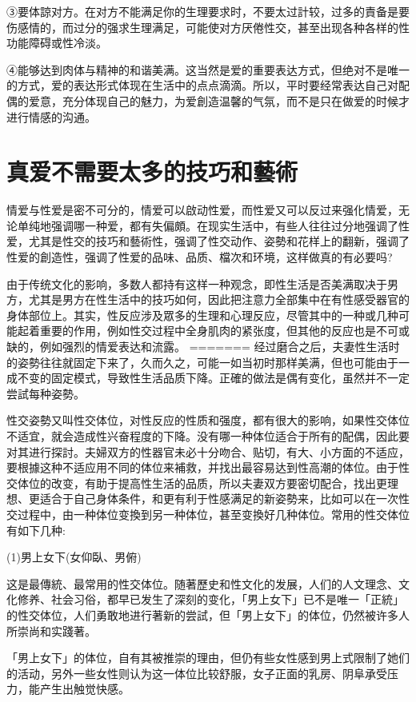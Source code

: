 \documentclass[12pt,UTF8]{ctexbook}
\begin{document}
③要体諒对方。在对方不能满足你的生理要求时，不要太过計较，过多的責备是要伤感情的，而过分的强求生理满足，可能使对方厌倦性交，甚至出现各种各样的性功能障碍或性冷淡。

④能够达到肉体与精神的和谐美满。这当然是爱的重要表达方式，但绝对不是唯一的方式，爱的表达形式体现在生活中的点点滴滴。所以，平时要经常表达自己对配偶的爱意，充分体现自己的魅力，为爱創造温馨的气氛，而不是只在做爱的时候才进行情感的沟通。

\section{真爱不需要太多的技巧和藝術}

情爱与性爱是密不可分的，情爱可以啟动性爱，而性爱又可以反过来强化情爱，无论单纯地强调哪一种爱，都有失偏頗。在现实生活中，有些人往往过分地强调了性爱，尤其是性交的技巧和藝術性，强调了性交动作、姿勢和花样上的翻新，强调了性爱的創造性，强调了性爱的品味、品质、檔次和环境，这样做真的有必要吗?

由于传统文化的影响，多数人都持有这样一种观念，即性生活是否美满取决于男方，尤其是男方在性生活中的技巧如何，因此把注意力全部集中在有性感受器官的身体部位上。其实，性反应涉及眾多的生理和心理反应，尽管其中的一种或几种可能起着重要的作用，例如性交过程中全身肌肉的紧张度，但其他的反应也是不可或缺的，例如强烈的情爱表达和流露。
=======
经过磨合之后，夫妻性生活时的姿勢往往就固定下来了，久而久之，可能一如当初时那样美满，但也可能由于一成不变的固定模式，导致性生活品质下降。正確的做法是偶有变化，虽然并不一定尝試每种姿勢。

性交姿勢又叫性交体位，对性反应的性质和强度，都有很大的影响，如果性交体位不适宜，就会造成性兴奋程度的下降。没有哪一种体位适合于所有的配偶，因此要对其进行探討。夫婦双方的性器官未必十分吻合、贴切，有大、小方面的不适应，要根據这种不适应用不同的体位来補救，并找出最容易达到性高潮的体位。由于性交体位的改变，有助于提高性生活的品质，所以夫妻双方要密切配合，找出更理想、更适合于自己身体条件，和更有利于性感满足的新姿勢来，比如可以在一次性交过程中，由一种体位变換到另一种体位，甚至变換好几种体位。常用的性交体位有如下几种:

(1)男上女下(女仰臥、男俯)

这是最傳統、最常用的性交体位。随著歷史和性文化的发展，人们的人文理念、文化修养、社会习俗，都早已发生了深刻的变化，「男上女下」已不是唯一「正統」的性交体位，人们勇敢地进行著新的尝試，但「男上女下」的体位，仍然被许多人所崇尚和实踐著。

「男上女下」的体位，自有其被推崇的理由，但仍有些女性感到男上式限制了她们的活动，另外一些女性则认为这一体位比较舒服，女子正面的乳房、阴阜承受压力，能产生出触觉快感。
\end{document}
